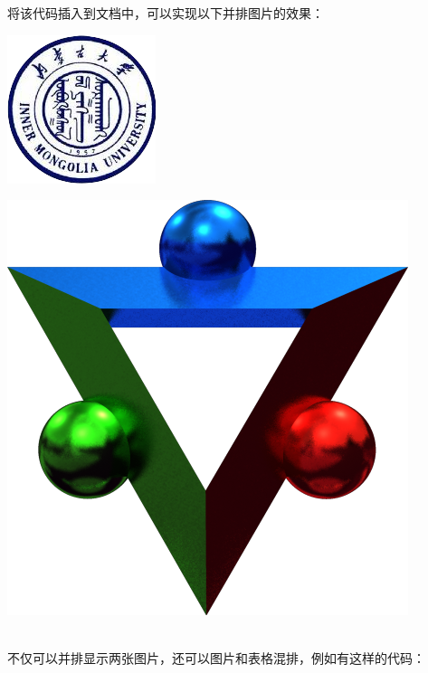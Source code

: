         将该代码插入到文档中，可以实现以下并排图片的效果：
        \\[\intextsep] 
            \begin{minipage}{0.5\textwidth} 
                \centering
                \includegraphics{figure/emblem.png}
                \label{fig:emblem} 
            \end{minipage}
            \begin{minipage}{0.5\textwidth} 
                \centering
                \includegraphics{figure/imudges.png}
                \label{fig:emblem} 
            \end{minipage}
        \\[\intextsep] 

        不仅可以并排显示两张图片，还可以图片和表格混排，例如有这样的代码：
        

